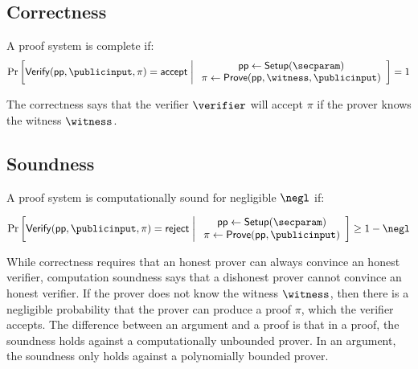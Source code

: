 \subsection{Correctness}
\begin{definition}
    A proof system is complete if: 
    \begin{equation}
        \operatorname{Pr}
            \left[
            \mathsf{Verify}(\publicparameter, \publicinput, \pi) = \mathsf{accept}
            \;\middle|\;
            \begin{array}{c}
                \publicparameter \gets \mathsf{Setup}(\secparam) \\
                \pi \gets \mathsf{Prove}(\publicparameter, \witness, \publicinput) \\ 
            \end{array}
            \right]
            = 1
    \end{equation} 
\end{definition}
The correctness says that the verifier $\verifier$ will accept $\pi$ if the prover knows the witness $\witness$. 

\subsection{Soundness}
\begin{definition}
    A proof system is computationally sound for negligible $\negl$ if:

    \begin{equation}
        \operatorname{Pr}
            \left[
            \mathsf{Verify}(\publicparameter, \publicinput, \pi) = \mathsf{reject}
            \;\middle|\;
            \begin{array}{c}
                \publicparameter \gets \mathsf{Setup}(\secparam) \\
                \pi \gets \mathsf{Prove}(\publicparameter, \publicinput) \\ 
            \end{array}
            \right]
            \geq 1 - \negl
    \end{equation} 
\end{definition}

While correctness requires that an honest prover can always convince an honest verifier, computation soundness says that a dishonest prover cannot convince an honest verifier. If the prover does not know the witness $\witness$, then there is a negligible probability that the prover can produce a proof $\pi$, which the verifier accepts. The difference between an argument and a proof is that in a proof, the soundness holds against a computationally unbounded prover. In an argument, the soundness only holds against a polynomially bounded prover. 


